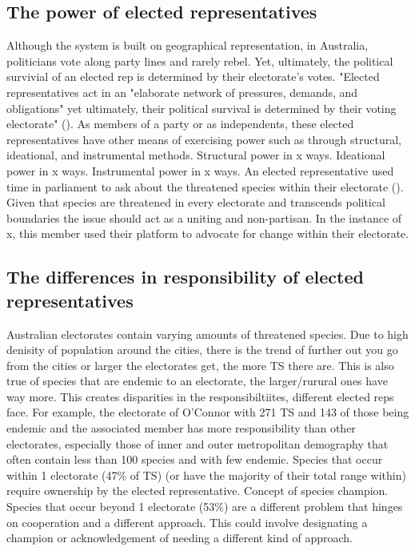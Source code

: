 \documentclass[a4paper,11pt]{article}
\begin{document}
\subsection{The power of elected representatives}

Although the system is built on geographical representation, in Australia, politicians vote along party lines and rarely rebel. Yet, ultimately, the political survivial of an elected rep is determined by their electorate's votes. "Elected representatives act in an "elaborate network of pressures, demands, and obligations" yet ultimately, their political survival is determined by their voting electorate" (\cite{pitkinConceptRepresentation1972,brentonRepresentativeRolesResponsibilities}).
As members of a party or as independents, these elected representatives have other means of exercising power such as through structural, ideational, and instrumental methods.
Structural power in x ways.
Ideational power in x ways.
Instrumental power in x ways.
An elected representative used time in parliament to ask about the threatened species within their electorate (\cite{househansardQUESTIONSWRITINGMayo2019}).
Given that species are threatened in every electorate and transcends political boundaries the issue should act as a uniting and non-partisan.
In the instance of x, this member used their platform to advocate for change within their electorate.

\subsection{The differences in responsibility of elected representatives}

Australian electorates contain varying amounts of threatened species. Due to high denisity of population around the cities, there is the trend of further out you go from the cities or larger the electorates get, the more TS there are. This is also true of species that are endemic to an electorate, the larger/rurural ones have way more. This creates disparities in the responsibiltiites, different elected reps face. For example, the electorate of O'Connor with 271 TS and 143 of those being endemic and the associated member has more responsibility than other electorates, especially those of inner and outer metropolitan demography that often contain less than 100 species and with few endemic.
Species that occur within 1 electorate (47\% of TS) (or have the majority of their total range within) require ownership by the elected representative. Concept of species champion.
Species that occur beyond 1 electorate (53\%) are a different problem that hinges on cooperation and a different approach. This could involve designating a champion or acknowledgement of needing a different kind of approach.
\end{document}
